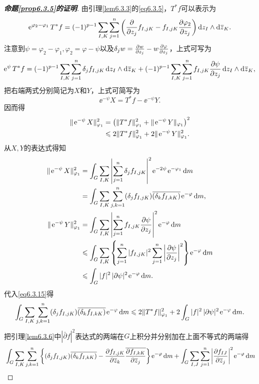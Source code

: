 \begin{proof}[\textbf{命题\ref{prop6.3.5}的证明}]
	
	由引理\ref{lem6.3.3}的\eqref{eq6.3.5}，$T^\ast f$可以表示为
	\[\operatorname{\!\!\;\mathrm e}^{\varphi_2-\varphi_1}T^\ast f=(-1)^{p-1}\sum_{I,K}\sum_{j=1}^{n}\left(\frac{\partial }{\partial z_j}f_{I,jK}-f_{I,jK}\frac{\partial \varphi_2}{\partial z_j}\right)\mathop{}\!\mathrm dz_I\wedge\mathop{}\!\mathrm d{}\mkern1mu\overline{\mkern-1muz}_K.\]
	注意到$\psi=\varphi_2-\varphi_1,\varphi_2=\varphi-\psi$以及$\delta_j w=\frac{\partial w}{\partial z_j}-w\frac{\partial \varphi}{\partial z_j}$，上式可写为
	\[\operatorname{\!\!\;\mathrm e}^\psi T^\ast f=(-1)^{p-1}\sum_{I,K}\sum_{j=1}^{n}\delta_j f_{I,jK}\mathop{}\!\mathrm dz_I\wedge\mathop{}\!\mathrm d{}\mkern1mu\overline{\mkern-1muz}_K+(-1)^{p-1}\sum_{I,K}\sum_{j=1}^{n}f_{I,jK}\frac{\partial \psi}{\partial z_j}\mathop{}\!\mathrm dz_I\wedge\mathop{}\!\mathrm d{}\mkern1mu\overline{\mkern-1muz}_K,\]
	把右端两式分别简记为$X$和$Y$，上式可简写为
	\[\ee^{-\psi}X=T^\ast f-\ee^{-\psi}Y.\]
	因而得
	\begin{align}\label{eq6.3.15}
		\Vert \operatorname{\!\!\;\mathrm e}^{-\psi}X\Vert_{\varphi_1}^2
		&=\left(\Vert T^\ast f\Vert_{\varphi_1}^2+\Vert \operatorname{\!\!\;\mathrm e}^{-\psi} Y\Vert_{\varphi_1}\right)^2\notag\\
		&\leqslant2\Vert T^\ast f\Vert_{\varphi_1}^2+2\Vert\operatorname{\!\!\;\mathrm e}^{-\psi}Y\Vert_{\varphi_1}^2.
	\end{align}
	从$X,Y$的表达式得知
	\begin{align*}
		\Vert\ee^{-\psi}X\Vert_{\varphi_1}^2
		&=\int_G \sum_{I,K}\left|\sum_{j=1}^{n}\delta_j f_{I,jK}\right|^2\ee^{-2\psi}\ee^{-\varphi_1}\dif m\\
		&=\int_G\sum_{I,K}\sum_{j,k=1}^{n}(\delta_j f_{I,jK})\bar{(\delta_k f_{I,kK})}\ee^{-\varphi}\dif m,\\
		\Vert \ee^{-\psi}Y\Vert_{\varphi_1}^2
		&=\int_G\sum_{I,K}\left|\sum_{j=1}^{n}f_{I,jK}\pp{\psi}{z_j}\right|^2\ee^{-\varphi}\dif m\\
		&\le\int_G \sum_{I,K}\left\{\sum_{j=1}^{n}|f_{I,jK}|^2\sum_{j=1}^{n}\left|\pp{\psi}{z_j}\right|^2\right\}\ee^{-\varphi}\dif m\\
		&\le\int_G |f|^2\,|\partial\psi|^2\ee^{-\varphi}\dif m.
	\end{align*}
	代入\eqref{eq6.3.15}得
	\[\int_G\sum_{I,K}\sum_{j,k=1}^{n}(\delta_j f_{I,jK}){}\mkern1mu\overline{\mkern-1mu(\delta_k f_{I,kK})}\operatorname{\!\!\;\mathrm e}^{-\varphi}\mathop{}\!\mathrm{d} m\leqslant 2\Vert T^\ast f\Vert_{\varphi_1}^2+2\int_G |f|^2\,|\partial\psi|^2\operatorname{\!\!\;\mathrm e}^{-\varphi}\mathop{}\!\mathrm{d} m.\]
	把引理\ref{lem6.3.6}中$\left|\bar{\partial}f\right|^2$表达式的两端在$G$上积分并分别加在上面不等式的两端得
	\begin{align*}
		&\int_G\sum_{I,K}\sum_{j,k=1}^{n}\left\{(\delta_j f_{I,jK})\bar{(\delta_k f_{I,kK})}-\pp{f_{I,jK}}{\bar{z}_k}\bar{\pp{f_{I,kK}}{\bar{z}_j}}\right\}\ee^{-\varphi}\dif m+\int_G\sum_{I,J}\sum_{j=1}^{n}\left|\pp{f_{IJ}}{\bar{z}_j}\right|^2\ee^{-\varphi}\dif m\\

\end{align*}
\end{proof}
